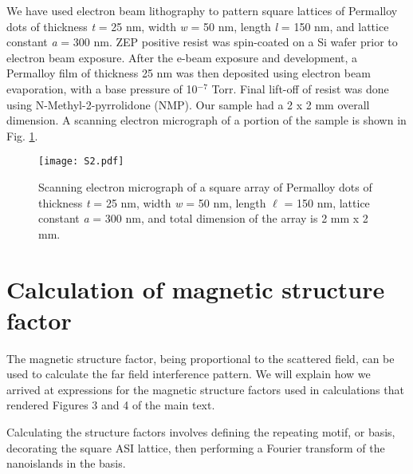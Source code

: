 \documentclass[aps, prb, reprint, showpacs, superscriptaddress]{revtex4-1}
\begin{document}
We have used electron beam lithography to pattern square lattices of Permalloy dots of thickness \emph{t} = 25 nm, width \emph{w} = 50 nm, length \textit{l} = 150 nm, and lattice constant \textit{a} = 300 nm. 
ZEP positive resist was spin-coated on a Si wafer prior to electron beam exposure. 
After the e-beam exposure and development, a Permalloy film of thickness 25 nm was then deposited using electron beam evaporation, with a base pressure of 10$^{-7}$ Torr. 
Final lift-off of resist was done using N-Methyl-2-pyrrolidone (NMP). 
Our sample had a 2 x 2 mm overall dimension.
A scanning electron micrograph of a portion of the sample is shown in Fig. \ref{SEM}.
\begin{figure}[ht]
\begin{center}
\texttt{[image: S2.pdf]}
\caption {Scanning electron micrograph of a square array of Permalloy dots of thickness \emph{t} = 25 nm, width \emph{w} = 50 nm, length \emph{$\ell$} = 150 nm, lattice constant \emph{a} = 300 nm, and total dimension of the array is 2 mm x 2 mm.}
\end{center}
\label{SEM}
\end{figure}

\section{Calculation of magnetic structure factor}

The magnetic structure factor, being proportional to the scattered field, can be used to calculate the far field interference pattern.
We will explain how we arrived at expressions for the magnetic structure factors used in calculations that rendered Figures 3 and 4 of the main text.

Calculating the structure factors involves defining the repeating motif, or basis, decorating the square ASI lattice, then performing a Fourier transform of the nanoislands in the basis.\cite{warren}
\end{document}
